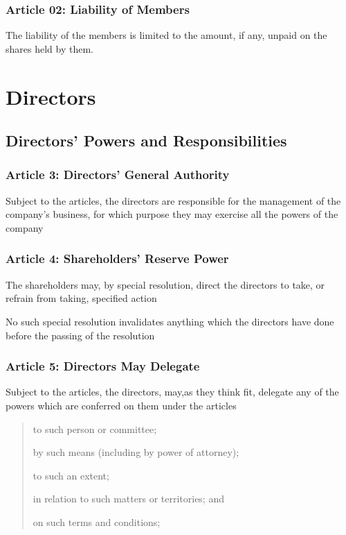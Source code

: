 \documentclass[letterpaper,10pt,english]{sphinxmanual}
\begin{document}
\subsection{Article 02: Liability of Members}
\label{\detokenize{introduction:article-02-liability-of-members}}
The liability of the members is limited to the amount, if any, unpaid on the shares held by them.


\chapter{Directors}
\label{\detokenize{directors:directors}}\label{\detokenize{directors::doc}}

\section{Directors’ Powers and Responsibilities}
\label{\detokenize{directors:directors-powers-and-responsibilities}}

\subsection{Article 3: Directors’ General Authority}
\label{\detokenize{directors:article-3-directors-general-authority}}\label{\detokenize{directors:article-3}}
Subject to the articles, the directors are responsible for the management of the company’s business, for which purpose they may exercise all the powers of the company


\subsection{Article 4: Shareholders’ Reserve Power}
\label{\detokenize{directors:article-4-shareholders-reserve-power}}\label{\detokenize{directors:article-4}}
 The shareholders may, by special resolution, direct the directors to take, or refrain from taking, specified action

 No such special resolution invalidates anything which the directors have done before the passing of the resolution


\subsection{Article 5: Directors May Delegate}
\label{\detokenize{directors:article-5-directors-may-delegate}}\label{\detokenize{directors:article-5}}
 Subject to the articles, the directors, may,as they think fit, delegate any of the powers which are conferred on them under the articles
\begin{quote}

 to such person or committee;

 by such means (including by power of attorney);

 to such an extent;

 in relation to such matters or territories; and

 on such terms and conditions;
\end{quote}
\end{document}
